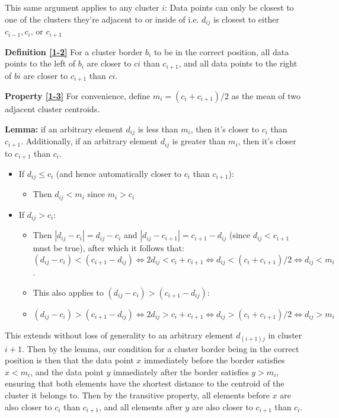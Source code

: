\documentclass[conference,compsoc]{IEEEtran}
\begin{document}
This same argument applies to any cluster $i$: Data points can only be closest to one of the clusters they’re adjacent to or inside of
i.e. $d_{ij}$ is closest to either $c_{i-1}, c_i$, or $c_{i+1}$

\textbf{Definition \ref{1-2}}
For a cluster border $b_i$ to be in the correct position, all data points to the left of $b_i$ are closer to $ci$ than $c_{i+1}$, and all data points to the right of $bi$ are closer to $c_{i+1}$ than $ci$.

\textbf{Property \ref{1-3}}
For convenience, define $m_i = (c_i+c_{i+1})/2$ as the mean of two adjacent cluster centroids.

\textbf{Lemma:}
if an arbitrary element $d_{ij}$ is less than $m_i$, then it’s closer to $c_i$ than $c_{i+1}$.
Additionally, if an arbitrary element $d_{ij}$ is greater than $m_i$, then it’s closer to $c_{i+1}$ than $c_i$.

\begin{itemize}
    \item If $d_{ij} \leq c_i$ (and hence automatically closer to $c_i$ than $c_{i+1}$):
    \begin{itemize}
        \item Then $d_{ij} < m_i$ since $m_i > c_i$
    \end{itemize}
    \item If $d_{ij} > c_i:$
    \begin{itemize}
        \item Then $|d_{ij} - c_i| = d_{ij} - c_i$ and $|d_{ij}-c_{i+1}| = c_{i+1}-d_{ij}$ (since $d_{ij} < c_{i+1}$ must be true), after which it follows that: $(d_{ij}-c_i) < (c_{i+1}-d_{ij}) \iff 2d_{ij} < c_i+c_{i+1} \iff d_{ij} < (c_i+c_{i+1})/2 \iff d_{ij} < m_i$.
        \item This also applies to $(d_{ij}-c_i) > (c_{i+1}-d_{ij})$: 
        \item $(d_{ij}-c_i) > (c_{i+1}-d_{ij}) \iff 2d_{ij} > c_i+c_{i+1} \iff d_{ij} > (c_i+c_{i+1})/2 \iff d_{ij} > m_i$
    \end{itemize}
\end{itemize}

This extends without loss of generality to an arbitrary element $d_{(i+1)j}$ in cluster $i+1$.
Then by the lemma, our condition for a cluster border being in the correct position is then that
the data point $x$ immediately before the border satisfies $x < m_i$, and the data point $y$ immediately after the border satisfies $y > m_i$,
ensuring that both elements have the shortest distance to the centroid of the cluster it belongs to.
Then by the transitive property, all elements before $x$ are also closer to $c_i$ than $c_{i+1}$, and all elements after $y$ are also closer to $c_{i+1}$ than $c_i$.
\end{document}
